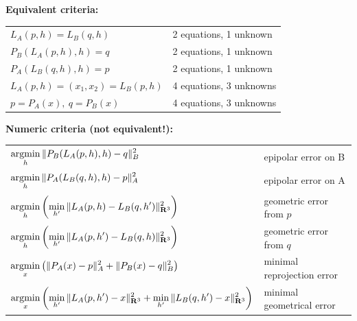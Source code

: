 \clearpage

{\bf Equivalent criteria:}\\
\begin{tabular}{ll}
$L_A(p,h)=L_B(q,h)$  & 2 equations, 1 unknown\\
$P_B(L_A(p,h),h)=q$  & 2 equations, 1 unknown\\
$P_A(L_B(q,h),h)=p$  & 2 equations, 1 unknown\\
$L_A(p,h)=(x_1,x_2)=L_B(p,h)$ & 4 equations, 3 unknowns\\
$p=P_A(x),\ q=P_B(x)$ & 4 equations, 3 unknowns\\
\end{tabular}

{\bf Numeric criteria (not equivalent!):}\\
\begin{tabular}{ll}
	$\displaystyle\mathop{\rm argmin}_h\|P_B(L_A(p,h),h)-q\|_B^2$ & epipolar error on B \\
	$\displaystyle\mathop{\rm argmin}_h\|P_A(L_B(q,h),h)-p\|_A^2$ & epipolar error on A \\
	$\displaystyle\mathop{\rm argmin}_h\left(\min_{h'}\|L_A(p,h)-L_B(q,h')\|^2_{\mathbf{R}^3}\right)$
	& geometric error from $p$ \\
	$\displaystyle\mathop{\rm argmin}_h\left(\min_{h'}\|L_A(p,h')-L_B(q,h)\|^2_{\mathbf{R}^3}\right)$
	& geometric error from $q$ \\
	$\displaystyle\mathop{\rm argmin}_x\left(
		\|P_A(x)-p\|^2_A
		+
		\|P_B(x)-q\|^2_B
	\right)$
	& minimal reprojection error \\
	$\displaystyle\mathop{\rm argmin}_x\left(
	\min_{h'}\|L_A(p,h')-x\|^2_{\mathbf{R}^3}
	+
	\min_{h'}\|L_B(q,h')-x\|^2_{\mathbf{R}^3}
	\right)$ & minimal geometrical error
\end{tabular}



